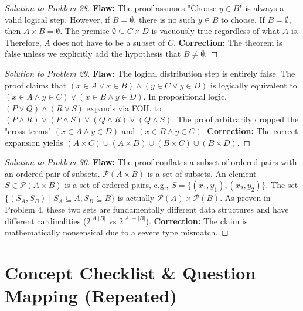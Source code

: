 \documentclass[11pt]{article}
\begin{document}
\begin{proof}[Solution to Problem 28]
\textbf{Flaw:} The proof assumes "Choose $y \in B$" is always a valid logical step. However, if $B = \emptyset$, there is no such $y \in B$ to choose. If $B = \emptyset$, then $A \times B = \emptyset$. The premise $\emptyset \subseteq C \times D$ is vacuously true regardless of what $A$ is. Therefore, $A$ does not have to be a subset of $C$. 
\textbf{Correction:} The theorem is false unless we explicitly add the hypothesis that $B \neq \emptyset$.
\end{proof}

\begin{proof}[Solution to Problem 29]
\textbf{Flaw:} The logical distribution step is entirely false. The proof claims that $(x \in A \lor x \in B) \land (y \in C \lor y \in D)$ is logically equivalent to $(x \in A \land y \in C) \lor (x \in B \land y \in D)$. 
In propositional logic, $(P \lor Q) \land (R \lor S)$ expands via FOIL to $(P \land R) \lor (P \land S) \lor (Q \land R) \lor (Q \land S)$. 
The proof arbitrarily dropped the "cross terms" $(x \in A \land y \in D)$ and $(x \in B \land y \in C)$. 
\textbf{Correction:} The correct expansion yields $(A \times C) \cup (A \times D) \cup (B \times C) \cup (B \times D)$.
\end{proof}

\begin{proof}[Solution to Problem 30]
\textbf{Flaw:} The proof conflates a subset of ordered pairs with an ordered pair of subsets. 
$\mathcal{P}(A \times B)$ is a set of subsets. An element $S \in \mathcal{P}(A \times B)$ is a set of ordered pairs, e.g., $S = \{(x_1, y_1), (x_2, y_2)\}$. 
The set $\{ (S_A, S_B) \mid S_A \subseteq A, S_B \subseteq B \}$ is actually $\mathcal{P}(A) \times \mathcal{P}(B)$. 
As proven in Problem 4, these two sets are fundamentally different data structures and have different cardinalities ($2^{|A||B|}$ vs $2^{|A|+|B|}$). 
\textbf{Correction:} The claim is mathematically nonsensical due to a severe type mismatch.
\end{proof}

\newpage

\section{Concept Checklist \& Question Mapping (Repeated)}
\label{sec:checklist_end}
\end{document}
